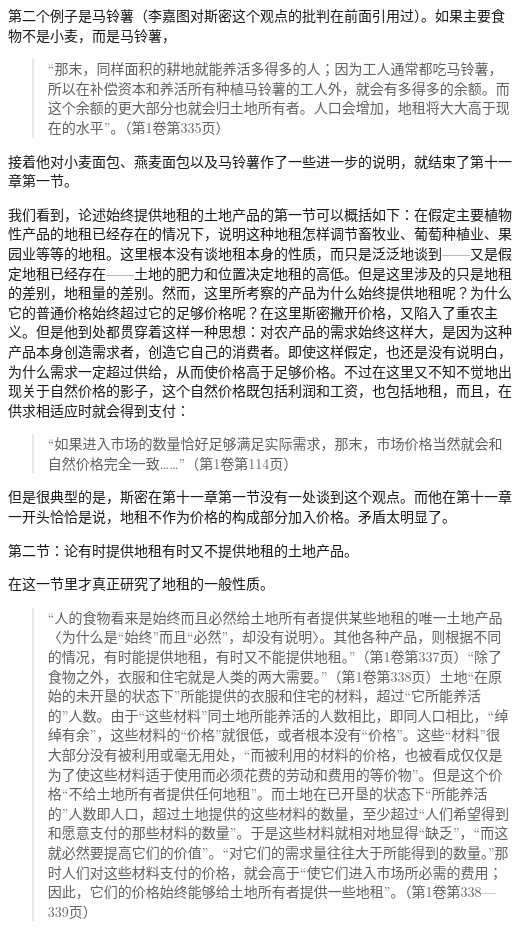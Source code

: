 第二个例子是马铃薯（李嘉图对斯密这个观点的批判在前面引用过）。如果主要食物不是小麦，而是马铃薯，

\begin{quote}{“那末，同样面积的耕地就能养活多得多的人；因为工人通常都吃马铃薯，所以在补偿资本和养活所有种植马铃薯的工人外，就会有多得多的余额。而这个余额的更大部分也就会归土地所有者。人口会增加，地租将大大高于现在的水平”。（第1卷第335页）}\end{quote}

接着他对小麦面包、燕麦面包以及马铃薯作了一些进一步的说明，就结束了第十一章第一节。

我们看到，论述始终提供地租的土地产品的第一节可以概括如下：在假定主要植物性产品的地租已经存在的情况下，说明这种地租怎样调节畜牧业、葡萄种植业、果园业等等的地租。这里根本没有谈地租本身的性质，而只是泛泛地谈到——又是假定地租已经存在——土地的肥力和位置决定地租的高低。但是这里涉及的只是地租的差别，地租量的差别。然而，这里所考察的产品为什么始终提供地租呢？为什么它的普通价格始终超过它的足够价格呢？在这里斯密撇开价格，又陷入了重农主义。但是他到处都贯穿着这样一种思想：对农产品的需求始终这样大，是因为这种产品本身创造需求者，创造它自己的消费者。即使这样假定，也还是没有说明白，为什么需求一定超过供给，从而使价格高于足够价格。不过在这里又不知不觉地出现关于自然价格的影子，这个自然价格既包括利润和工资，也包括地租，而且，在供求相适应时就会得到支付：

\begin{quote}{“如果进入市场的数量恰好足够满足实际需求，那末，市场价格当然就会和自然价格完全一致……”（第1卷第114页）}\end{quote}

但是很典型的是，斯密在第十一章第一节没有一处谈到这个观点。而他在第十一章一开头恰恰是说，地租不作为价格的构成部分加入价格。矛盾太明显了。


第二节：论有时提供地租有时又不提供地租的土地产品。

在这一节里才真正研究了地租的一般性质。

\begin{quote}{“人的食物看来是始终而且必然给土地所有者提供某些地租的唯一土地产品〈为什么是“始终”而且“必然”，却没有说明〉。其他各种产品，则根据不同的情况，有时能提供地租，有时又不能提供地租。”（第1卷第337页）“除了食物之外，衣服和住宅就是人类的两大需要。”（第1卷第338页）土地“在原始的未开垦的状态下”所能提供的衣服和住宅的材料，超过“它所能养活的”人数。由于“这些材料”同土地所能养活的人数相比，即同人口相比，“绰绰有余”，这些材料的“价格”就很低，或者根本没有“价格”。这些“材料”很大部分没有被利用或毫无用处，“而被利用的材料的价格，也被看成仅仅是为了使这些材料适于使用而必须花费的劳动和费用的等价物”。但是这个价格“不给土地所有者提供任何地租”。而土地在已开垦的状态下“所能养活的”人数即人口，超过土地提供的这些材料的数量，至少超过“人们希望得到和愿意支付的那些材料的数量”。于是这些材料就相对地显得“缺乏”，“而这就必然要提高它们的价值”。“对它们的需求量往往大于所能得到的数量。”那时人们对这些材料支付的价格，就会高于“使它们进入市场所必需的费用；因此，它们的价格始终能够给土地所有者提供一些地租”。（第1卷第338—339页）}\end{quote}

